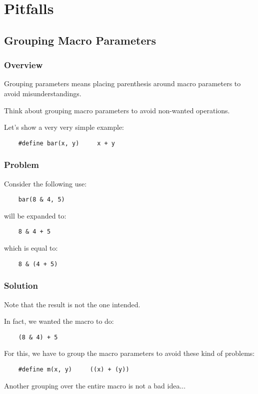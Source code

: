 \section{Pitfalls}

%
%

\subsection{Grouping Macro Parameters}


\begin{frame}[containsverbatim]
  \frametitle{Overview}

  Grouping parameters means placing parenthesis around macro parameters
  to avoid misunderstandings.

  \nl

  Think about grouping macro parameters to avoid non-wanted operations.

  \nl

  Let's show a very very simple example:

  \begin{verbatim}
    #define bar(x, y)     x + y
  \end{verbatim}
\end{frame}


\begin{frame}[containsverbatim]
  \frametitle{Problem}

  Consider the following use:

  \begin{verbatim}
    bar(8 & 4, 5)
  \end{verbatim}

  will be expanded to:

  \begin{verbatim}
    8 & 4 + 5
  \end{verbatim}

  which is equal to:

  \begin{verbatim}
    8 & (4 + 5)
  \end{verbatim}
\end{frame}


\begin{frame}[containsverbatim]
  \frametitle{Solution}

  Note that the result is not the one intended.

  \nl

  In fact, we wanted the macro to do:

  \begin{verbatim}
    (8 & 4) + 5
  \end{verbatim}

  For this, we have to group the macro parameters to avoid these kind of
  problems:

  \begin{verbatim}
    #define m(x, y)     ((x) + (y))
  \end{verbatim}

  Another grouping over the entire macro is not a bad idea...
\end{frame}

